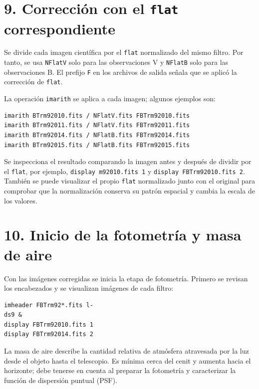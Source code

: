 \documentclass[11pt]{article}
\begin{document}
\newpage
\section*{9. Corrección con el \texttt{flat} correspondiente}

Se divide cada imagen científica por el \texttt{flat} normalizado del mismo
filtro. Por tanto, se usa \texttt{NFlatV} solo para las observaciones V y
\texttt{NFlatB} solo para las observaciones B. El prefijo \texttt{F} en los
archivos de salida señala que se aplicó la corrección de \texttt{flat}.

\begin{center}
  
\end{center}

La operación \texttt{imarith} se aplica a cada imagen; algunos ejemplos son:

\begin{verbatim}
imarith BTrm92010.fits / NFlatV.fits FBTrm92010.fits
imarith BTrm92011.fits / NFlatV.fits FBTrm92011.fits
imarith BTrm92014.fits / NFlatB.fits FBTrm92014.fits
imarith BTrm92015.fits / NFlatB.fits FBTrm92015.fits
\end{verbatim}

Se inspecciona el resultado comparando la imagen antes y después de dividir por
el \texttt{flat}, por ejemplo, \texttt{display m92010.fits 1} y
\texttt{display FBTrm92010.fits 2}. También se puede visualizar el propio
\texttt{flat} normalizado junto con el original para comprobar que la
normalización conserva su patrón espacial y cambia la escala de los valores.

\newpage
\section*{10. Inicio de la fotometría y masa de aire}

Con las imágenes corregidas se inicia la etapa de fotometría. Primero se
revisan los encabezados y se visualizan imágenes de cada filtro:

\begin{verbatim}
imheader FBTrm92*.fits l-
ds9 &
display FBTrm92010.fits 1
display FBTrm92014.fits 2
\end{verbatim}

La masa de aire describe la cantidad relativa de atmósfera atravesada por la
luz desde el objeto hasta el telescopio. Es mínima cerca del cenit y aumenta
hacia el horizonte; debe tenerse en cuenta al preparar la fotometría y
caracterizar la función de dispersión puntual (PSF).
\end{document}
